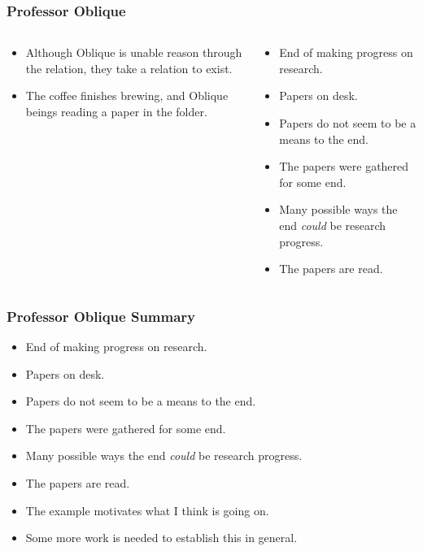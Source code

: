 \documentclass[noamssymb, compress, handout]{beamer} %
\newcommand{\hozlinedash}[0]{%
  \noindent\hdashrule[0.5ex][c]{\textwidth}{.1pt}{2.5pt}
}
\begin{document}
\begin{frame}
  \frametitle{Professor Oblique}

  \begin{columns}[c]
    \begin{column}{0.6\textwidth}
      {\addtolength{\leftmargini}{-2\labelsep}
        \begin{itemize}
        \item<1-> Although Oblique is unable reason through the relation, they take a relation to exist.
        \item<2-> The coffee finishes brewing, and Oblique beings reading a paper in the folder.
        \end{itemize}
      }
    \end{column}
    \vrule{}
    \begin{column}{0.3\textwidth}
      {
        \footnotesize
        \begin{itemize}
        \item End of making progress on research.
        \item Papers on desk.
        \item Papers do not seem to be a means to the end.
        \item The papers were gathered for some end.
        \item Many possible ways the end \emph{could} be research progress.
        \item<2-> The papers are read.
        \end{itemize}
      }
    \end{column}
  \end{columns}
\end{frame}


\begin{frame}
  \frametitle{Professor Oblique Summary}

  \begin{itemize}
  \item End of making progress on research.
  \item Papers on desk.
  \item Papers do not seem to be a means to the end.
  \item The papers were gathered for some end.
  \item Many possible ways the end \emph{could} be research progress.
  \item The papers are read.
  \end{itemize}

  \hozlinedash

  \begin{itemize}
  \item The example motivates what I think is going on.
  \item Some more work is needed to establish this in general.
  \end{itemize}

\end{frame}
\end{document}
